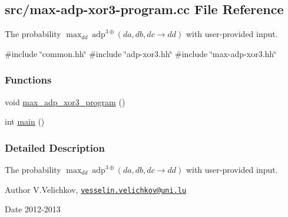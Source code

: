 \hypertarget{max-adp-xor3-program_8cc}{\subsection{src/max-\/adp-\/xor3-\/program.cc \-File \-Reference}
\label{max-adp-xor3-program_8cc}
}


\-The probability $\max_{dd}~\mathrm{adp}^{3\oplus}(da, db, dc \rightarrow dd)$ with user-\/provided input.  


{\ttfamily \#include \char`\"{}common.\-hh\char`\"{}}\*
{\ttfamily \#include \char`\"{}adp-\/xor3.\-hh\char`\"{}}\*
{\ttfamily \#include \char`\"{}max-\/adp-\/xor3.\-hh\char`\"{}}\*
\subsubsection*{\-Functions}
\begin{DoxyCompactItemize}
\item 
void \hyperlink{max-adp-xor3-program_8cc_ac90fb392d025b6007f268a7bc0eb51a7}{max\-\_\-adp\-\_\-xor3\-\_\-program} ()
\item 
int \hyperlink{max-adp-xor3-program_8cc_ae66f6b31b5ad750f1fe042a706a4e3d4}{main} ()
\end{DoxyCompactItemize}


\subsubsection{\-Detailed \-Description}
\-The probability $\max_{dd}~\mathrm{adp}^{3\oplus}(da, db, dc \rightarrow dd)$ with user-\/provided input. \begin{DoxyAuthor}{\-Author}
\-V.\-Velichkov, \href{mailto:vesselin.velichkov@uni.lu}{\tt vesselin.\-velichkov@uni.\-lu} 
\end{DoxyAuthor}
\begin{DoxyDate}{\-Date}
2012-\/2013 
\end{DoxyDate}


